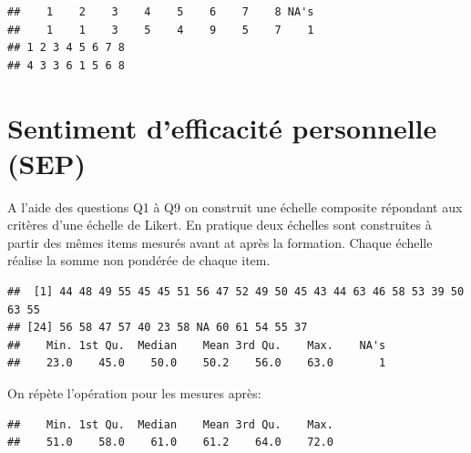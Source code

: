 \documentclass[12pt,english,french]{article}\usepackage{graphicx, color}
\makeatletter
\newenvironment{kframe}{%
 \def\at@end@of@kframe{}%
 \ifinner\ifhmode%
  \def\at@end@of@kframe{\end{minipage}}%
  \begin{minipage}{\columnwidth}%
 \fi\fi%
 \def\FrameCommand##1{\hskip\@totalleftmargin \hskip-\fboxsep
 \colorbox{shadecolor}{##1}\hskip-\fboxsep
     \hskip-\linewidth \hskip-\@totalleftmargin \hskip\columnwidth}%
 \MakeFramed {\advance\hsize-\width
   \@totalleftmargin\z@ \linewidth\hsize
   \@setminipage}}%
 {\par\unskip\endMakeFramed%
 \at@end@of@kframe}
\newenvironment{knitrout}{}{} %
\makeatother
\begin{document}
\begin{knitrout}
\color{fgcolor}\begin{kframe}
\begin{verbatim}
##    1    2    3    4    5    6    7    8 NA's 
##    1    1    3    5    4    9    5    7    1
## 1 2 3 4 5 6 7 8 
## 4 3 3 6 1 5 6 8
\end{verbatim}
\end{kframe}
\end{knitrout}


\section{Sentiment d'efficacité personnelle (SEP)}

A l'aide des questions Q1 à Q9 on construit une échelle composite répondant aux critères d'une échelle de Likert. En pratique deux échelles sont construites à partir des mêmes items mesurés avant at après la formation. Chaque échelle réalise la somme non pondérée de chaque item.
\begin{knitrout}
\color{fgcolor}\begin{kframe}
\begin{verbatim}
##  [1] 44 48 49 55 45 45 51 56 47 52 49 50 45 43 44 63 46 58 53 39 50 63 55
## [24] 56 58 47 57 40 23 58 NA 60 61 54 55 37
##    Min. 1st Qu.  Median    Mean 3rd Qu.    Max.    NA's 
##    23.0    45.0    50.0    50.2    56.0    63.0       1
\end{verbatim}
\end{kframe}
\end{knitrout}

On répète l'opération pour les mesures après:
\begin{knitrout}
\color{fgcolor}\begin{kframe}
\begin{verbatim}
##    Min. 1st Qu.  Median    Mean 3rd Qu.    Max. 
##    51.0    58.0    61.0    61.2    64.0    72.0
\end{verbatim}
\end{kframe}
\end{knitrout}
\end{document}
